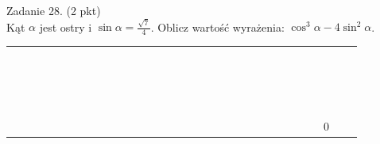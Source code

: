 \documentclass[10pt]{article}
\begin{document}
Zadanie 28. (2 pkt)\\
Kąt \(\alpha\) jest ostry i \(\sin \alpha=\frac{\sqrt{7}}{4}\). Oblicz wartość wyrażenia: \(\cos ^{3} \alpha-4 \sin ^{2} \alpha\).

\begin{center}
\begin{tabular}{|c|c|c|c|c|c|c|c|c|c|c|c|c|c|c|c|c|c|c|c|c|c|c|c|c|c|c|c|c|c|c|}
\hline
 &  &  &  &  &  &  &  &  &  &  &  &  &  &  &  &  &  &  &  &  &  &  &  &  &  &  &  &  &  &  \\
\hline
 &  &  &  &  &  &  &  &  &  &  &  &  &  &  &  &  &  &  &  &  &  &  &  &  &  &  &  &  &  &  \\
\hline
 &  &  &  &  &  &  &  &  &  &  &  &  &  &  &  &  &  &  &  &  &  &  &  &  &  &  &  &  &  &  \\
\hline
 &  &  &  &  &  &  &  &  &  &  &  &  &  &  &  &  &  &  &  &  &  &  &  &  &  &  &  &  &  &  \\
\hline
 &  &  &  &  &  &  &  &  &  &  &  &  &  &  &  &  &  &  &  &  &  &  &  &  &  &  &  &  &  &  \\
\hline
 &  &  &  &  &  &  &  &  &  &  &  &  &  &  &  &  &  &  &  &  &  &  &  &  &  &  &  &  &  &  \\
\hline
 &  &  &  &  &  &  &  &  &  &  &  &  &  &  &  &  &  &  &  &  &  &  &  &  &  &  &  &  &  &  \\
\hline
 &  &  &  &  &  &  &  &  &  &  &  &  &  &  &  &  &  &  &  &  &  &  &  &  &  &  &  &  &  &  \\
\hline
 &  &  &  &  &  &  &  &  &  &  &  &  &  &  &  &  &  &  &  &  &  &  &  &  &  &  &  &  &  &  \\
\hline
 &  &  &  &  &  &  &  &  &  &  &  &  &  &  &  &  &  &  &  &  &  &  &  &  &  &  &  &  &  &  \\
\hline
 &  &  &  &  &  &  &  &  &  &  &  &  &  &  &  &  &  &  &  &  &  &  &  &  &  &  &  &  &  &  \\
\hline
 &  &  &  &  &  &  &  &  &  &  &  &  &  &  &  &  &  &  &  &  &  &  &  &  &  &  &  &  &  &  \\
\hline
 &  &  &  &  &  &  &  &  &  &  &  &  &  &  &  &  &  &  &  &  &  &  &  &  &  &  &  &  &  &  \\
\hline
 &  &  &  &  &  &  &  &  &  &  &  &  &  &  &  &  &  &  &  &  &  &  &  &  &  &  &  &  &  &  \\
\hline
 &  &  &  &  &  &  &  &  &  &  &  &  &  &  &  &  &  &  &  &  &  &  &  &  &  &  &  &  &  &  \\
\hline
 &  &  &  &  &  &  &  &  &  &  &  &  &  &  &  &  &  &  &  &  &  &  &  &  &  &  &  &  &  &  \\
\hline
 &  &  &  &  &  &  &  &  &  &  &  &  &  &  &  &  &  &  &  &  &  &  &  &  &  &  &  &  &  &  \\
\hline
 &  &  &  &  &  &  &  &  &  &  &  &  &  &  &  &  &  &  &  &  &  &  &  &  &  &  &  &  &  &  \\
\hline
 &  &  &  &  &  &  &  &  &  &  &  &  &  &  &  &  &  &  &  &  &  &  &  &  &  &  &  & \( 0 \) &  &  \\
\hline
\end{tabular}
\end{center}
\end{document}
